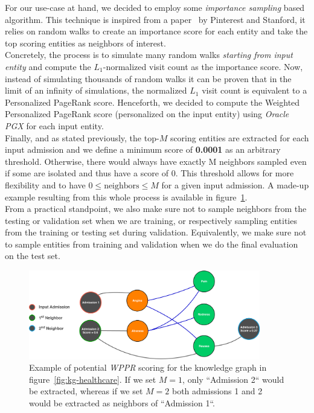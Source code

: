 For our use-case at hand, we decided to employ some \textit{importance sampling} based algorithm. This technique is inspired from a paper~\cite{DBLP:journals/corr/abs-1806-01973} by Pinterest and Stanford, it relies on random walks to create an importance score for each entity and take the top scoring entities as neighbors of interest. \\

Concretely, the process is to simulate many random walks \emph{starting from input entity} and compute the $L_1$-normalized visit count as the importance score. Now, instead of simulating thousands of random walks it can be proven that in the limit of an infinity of simulations, the normalized $L_1$ visit count is equivalent to a Personalized PageRank score. Henceforth, we decided to compute the Weighted Personalized PageRank score (personalized on the input entity) using \textit{Oracle PGX} for each input entity. \\

Finally, and as stated previously, the top-$M$ scoring entities are extracted for each input admission and we define a minimum score of \textbf{0.0001} as an arbitrary threshold. Otherwise, there would always have exactly M neighbors sampled even if some are isolated and thus have a score of 0. This threshold allows for more flexibility and to have $0 \leq \mbox{neighbors} \leq M$ for a given input admission. A made-up example resulting from this whole process is available in figure~\ref{fig:kg-healthcare-extraction}.\\

From a practical standpoint, we also make sure not to sample neighbors from the testing or validation set when we are training, or respectively sampling entities from the training or testing set during validation. Equivalently, we make sure not to sample entities from training and validation when we do the final evaluation on the test set.

\begin{figure}[H]
	\centering
	\includegraphics[width=0.9\textwidth]{figures/kg-healthcare-extraction.pdf}
	\caption{Example of potential \textit{WPPR} scoring for the knowledge graph in figure~\ref{fig:kg-healthcare}. If we set $M=1$, only ``Admission 2`` would be extracted, whereas if we set $M=2$ both admissions 1 and 2 would be extracted as neighbors of ``Admission 1``.}
	\label{fig:kg-healthcare-extraction}
\end{figure}

